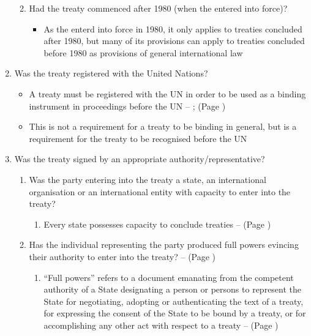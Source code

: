 \begin{enumerate}
\begin{enumerate}
\begin{enumerate}
        \end{enumerate}
        \item Had the treaty commenced after 1980 (when the  entered into force)?
        \begin{itemize}
            \item As the  enterd into force in 1980, it only applies to treaties concluded after 1980, but many of its provisions can apply to treaties concluded before 1980 as provisions of general international law
        \end{itemize}
    \end{enumerate}
    \item Was the treaty registered with the United Nations?
    \begin{itemize}
        \item A treaty must be registered with the UN in order to be used as a binding instrument in proceedings before the UN -- ;  (Page \pageref{convention:UN Charter Art 102})
        \item This is not a requirement for a treaty to be binding in general, but is a requirement for the treaty to be recognised before the UN
    \end{itemize}
    \item Was the treaty signed by an appropriate authority/representative?
    \begin{enumerate}
        \item Was the party entering into the treaty a state, an international organisation or an international entity with capacity to enter into the treaty?
        \begin{enumerate}
            \item Every state possesses capacity to conclude treaties --  (Page \pageref{VCLT Art 6})
        \end{enumerate}
        \item Has the individual representing the party produced full powers evincing their authority to enter into the treaty? --  (Page \pageref{VCLT Art 2})
        \begin{enumerate}
            \item ``Full powers'' refers to a document emanating from the competent authority of a State designating a person or persons to represent the State for negotiating, adopting or authenticating the text of a treaty, for expressing the consent of the State to be bound by a treaty, or for accomplishing any other act with respect to a treaty --  (Page \pageref{VCLT Art 2})

\end{enumerate}
\end{enumerate}
\end{enumerate}
